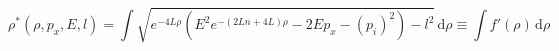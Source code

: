 \begin{equation}
\label{geod}
\rho^*(\rho, p_x,E,l)=\int
\sqrt{e^{-4L\rho}(E^2e^{-(2Ln+4L)\rho}-2Ep_x-(p_i)^2 )-l^2}\, \textrm{d}\rho \equiv \int
f'(\rho)\,\textrm{d}\rho
\end{equation}


